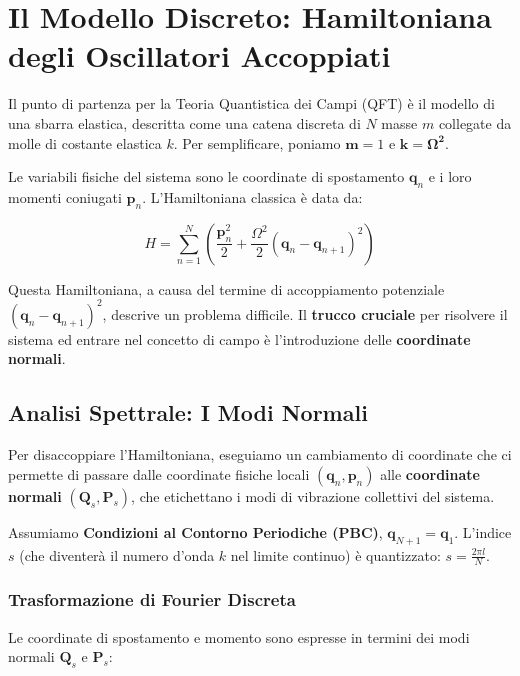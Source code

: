 
\section{Il Modello Discreto: Hamiltoniana degli Oscillatori Accoppiati}

Il punto di partenza per la Teoria Quantistica dei Campi (QFT) è il modello di una sbarra elastica, descritta come una catena discreta di $N$ masse $m$ collegate da molle di costante elastica $k$. Per semplificare, poniamo $\mathbf{m}=1$ e $\mathbf{k}=\mathbf{\Omega^2}$.

Le variabili fisiche del sistema sono le coordinate di spostamento $\mathbf{q}_n$ e i loro momenti coniugati $\mathbf{p}_n$. L'Hamiltoniana classica è data da:

\begin{equation}
H = \sum_{n=1}^{N} \left( \frac{\mathbf{p}_n^2}{2} + \frac{\Omega^2}{2}(\mathbf{q}_n - \mathbf{q}_{n+1})^2 \right)
\end{equation}

Questa Hamiltoniana, a causa del termine di accoppiamento potenziale $(\mathbf{q}_n - \mathbf{q}_{n+1})^2$, descrive un problema difficile. Il \textbf{trucco cruciale} per risolvere il sistema ed entrare nel concetto di campo è l'introduzione delle \textbf{coordinate normali}.

\subsection{Analisi Spettrale: I Modi Normali}

Per disaccoppiare l'Hamiltoniana, eseguiamo un cambiamento di coordinate che ci permette di passare dalle coordinate fisiche locali $(\mathbf{q}_n, \mathbf{p}_n)$ alle \textbf{coordinate normali} $(\mathbf{Q}_s, \mathbf{P}_s)$, che etichettano i modi di vibrazione collettivi del sistema.

Assumiamo \textbf{Condizioni al Contorno Periodiche (PBC)}, $\mathbf{q}_{N+1} = \mathbf{q}_1$. L'indice $s$ (che diventerà il numero d'onda $k$ nel limite continuo) è quantizzato: $s = \frac{2\pi l}{N}$.

\subsubsection{Trasformazione di Fourier Discreta}

Le coordinate di spostamento e momento sono espresse in termini dei modi normali $\mathbf{Q}_s$ e $\mathbf{P}_s$:


